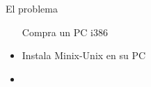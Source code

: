 \documentclass[hyperref={colorlinks}]{beamer}
\begin{document}
\begin{frame}
\begin{minipage}{.55\linewidth}
\begin{block}{El problema}
\begin{itemize}
                    \begin{minipage}{.75\linewidth} Compra un PC i386 \end{minipage}
                    \pause
                \item
                    \begin{minipage}{.2\linewidth}  \end{minipage}
                    \begin{minipage}{.75\linewidth} Instala Minix-Unix en su PC \end{minipage}
                    \pause
                \item
                    \begin{minipage}{.2\linewidth}  \end{minipage}

\end{itemize}
\end{block}
\end{minipage}
\end{frame}
\end{document}
